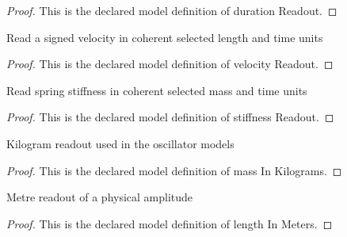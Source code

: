 \begin{proof}
  This is the declared model definition of duration Readout.
\end{proof}
\begin{definition}
  \label{def:physics:phyx-mini-0261:phyxminiproblems-problemphyxmini0261-velocityreadout}
  Read a signed velocity in coherent selected length and time units
\end{definition}
\begin{proof}
  This is the declared model definition of velocity Readout.
\end{proof}
\begin{definition}
  \label{def:physics:phyx-mini-0261:phyxminiproblems-problemphyxmini0261-stiffnessreadout}
  Read spring stiffness in coherent selected mass and time units
\end{definition}
\begin{proof}
  This is the declared model definition of stiffness Readout.
\end{proof}
\begin{definition}
  \label{def:physics:phyx-mini-0261:phyxminiproblems-problemphyxmini0261-massinkilograms}
  Kilogram readout used in the oscillator models
\end{definition}
\begin{proof}
  This is the declared model definition of mass In Kilograms.
\end{proof}
\begin{definition}
  \label{def:physics:phyx-mini-0261:phyxminiproblems-problemphyxmini0261-lengthinmeters}
  Metre readout of a physical amplitude
\end{definition}
\begin{proof}
  This is the declared model definition of length In Meters.
\end{proof}
